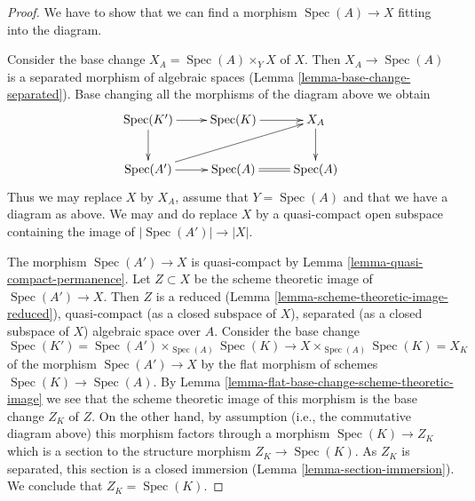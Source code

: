 \documentclass[10pt,a4paper]{amsart}
\theoremstyle{plain}
\theoremstyle{definition}
\theoremstyle{remark}
\numberwithin{equation}{subsection}
\def\Spec{\mathop{\mathrm{Spec}}}
\begin{document}
\begin{proof}
We have to show that we can find a morphism $\Spec(A) \to X$ fitting
into the diagram.

\medskip\noindent
Consider the base change $X_A = \Spec(A) \times_Y X$ of $X$.
Then $X_A \to \Spec(A)$ is a separated morphism of algebraic
spaces (Lemma \ref{lemma-base-change-separated}). Base changing
all the morphisms of the diagram above we obtain
$$
\xymatrix{
\Spec(K') \ar[r] \ar[d] & \Spec(K) \ar[r] & X_A \ar[d] \\
\Spec(A') \ar[r] \ar[rru] & \Spec(A) \ar@{=}[r] & \Spec(A)
}
$$
Thus we may replace $X$ by $X_A$, assume that $Y = \Spec(A)$ and
that we have a diagram as above. We may and do replace $X$ by
a quasi-compact open subspace containing the image of $|\Spec(A')| \to |X|$.

\medskip\noindent
The morphism $\Spec(A') \to X$ is quasi-compact by
Lemma \ref{lemma-quasi-compact-permanence}.
Let $Z \subset X$ be the scheme theoretic image of
$\Spec(A') \to X$. Then $Z$ is a reduced
(Lemma \ref{lemma-scheme-theoretic-image-reduced}),
quasi-compact (as a closed subspace of $X$), separated
(as a closed subspace of $X$) algebraic space over $A$.
Consider the base change
$$
\Spec(K') = \Spec(A') \times_{\Spec(A)} \Spec(K) \to
X \times_{\Spec(A)} \Spec(K) = X_K
$$
of the morphism $\Spec(A') \to X$ by the flat morphism of schemes
$\Spec(K) \to \Spec(A)$. By
Lemma \ref{lemma-flat-base-change-scheme-theoretic-image}
we see that the scheme theoretic image of this morphism
is the base change $Z_K$ of $Z$. On the other hand, by
assumption (i.e., the commutative diagram above)
this morphism factors through a morphism
$\Spec(K) \to Z_K$ which is a section to the structure morphism
$Z_K \to \Spec(K)$. As $Z_K$ is separated, this section is a
closed immersion (Lemma \ref{lemma-section-immersion}).
We conclude that $Z_K = \Spec(K)$.


\end{proof}
\end{document}
